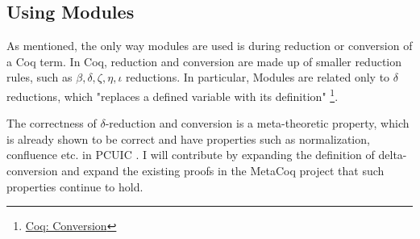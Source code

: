 \subsection{Using Modules}
\label{sec:using-modules}
As mentioned, the only way modules are used is during reduction or conversion
of a Coq term. In Coq, reduction and conversion are made up of smaller reduction
rules, such as $\beta, \delta,\zeta,\eta,\iota$ reductions. In particular, 
Modules are related only to $\delta$ reductions, which "replaces a defined
variable with its definition" 
\footnote{\href{https://coq.inria.fr/refman/language/core/conversion.html} {Coq:
Conversion}}.

The correctness of $\delta$-reduction and conversion is a meta-theoretic
property, which is already shown to be correct and have properties such as 
normalization, confluence etc. in PCUIC \cite{coqcoqcorrect}. I will
contribute by expanding the definition of delta-conversion and expand the
existing proofs in the MetaCoq project that such properties continue to hold.